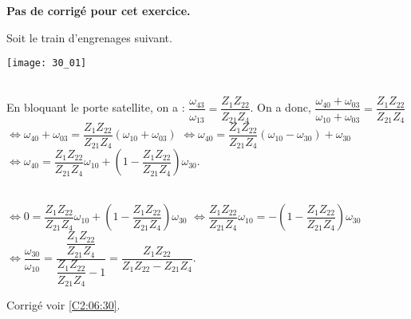 \normaltrue \difficilefalse \tdifficilefalse
\correctiontrue


\setcounter{question}{0}

\ifcorrection
\else
\textbf{Pas de corrigé pour cet exercice.}
\fi

\ifprof
\else
Soit le train d'engrenages suivant. 
\begin{marginfigure}
\texttt{[image: 30\_01]}
\end{marginfigure}
\fi


\ifprof
\else
\fi

\ifprof ~\\
 En bloquant le porte satellite, on a : $\dfrac{\omega_{43}}{\omega_{13}}=\dfrac{Z_{1}Z_{22}}{Z_{21}Z_{4}}$.
  On a donc, 
  $\dfrac{\omega_{40}+\omega_{03}}{\omega_{10}+\omega_{03}}=
\dfrac{Z_{1}Z_{22}}{Z_{21}Z_{4}}$
  $\Leftrightarrow \omega_{40}+\omega_{03}=\dfrac{Z_{1}Z_{22}}{Z_{21}Z_{4}}\left( \omega_{10}+\omega_{03} \right)$
  $\Leftrightarrow \omega_{40}=\dfrac{Z_{1}Z_{22}}{Z_{21}Z_{4}}\left( \omega_{10}-\omega_{30} \right) + \omega_{30}$
 $\Leftrightarrow \omega_{40}=\dfrac{Z_{1}Z_{22}}{Z_{21}Z_{4}}\omega_{10} +\left(1- \dfrac{Z_{1}Z_{22}}{Z_{21}Z_{4}}\right)\omega_{30}$.
\else
\fi

\ifprof~\\
$\Leftrightarrow 0=\dfrac{Z_{1}Z_{22}}{Z_{21}Z_{4}}\omega_{10} +\left(1- \dfrac{Z_{1}Z_{22}}{Z_{21}Z_{4}}\right)\omega_{30}$
$\Leftrightarrow  \dfrac{Z_{1}Z_{22}}{Z_{21}Z_{4}}\omega_{10} =-\left(1- \dfrac{Z_{1}Z_{22}}{Z_{21}Z_{4}}\right)\omega_{30}$
$\Leftrightarrow  \dfrac{\omega_{30}}{\omega_{10}} = \dfrac{ \dfrac{Z_{1}Z_{22}}{Z_{21}Z_{4}}}{ \dfrac{Z_{1}Z_{22}}{Z_{21}Z_{4}}-1}= \dfrac{ {Z_{1}Z_{22}}}{ {Z_{1}Z_{22}}-Z_{21}Z_{4}}$.
\else
\fi

\ifprof
\else
\begin{flushright}
\footnotesize{Corrigé  voir \ref{C2:06:30}.}
\end{flushright}%
\fi
